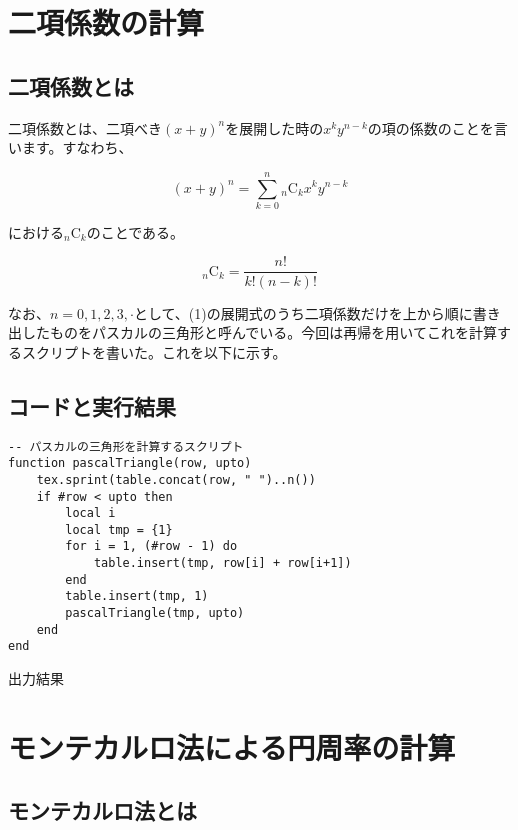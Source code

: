 \documentclass[a4paper]{article}
\begin{document}
	\section{二項係数の計算}
	\subsection{二項係数とは}
	二項係数とは、二項べき$(x + y)^{n}$を展開した時の$x^{k}y^{n-k}$の項の係数のことを言います。すなわち、

	\begin{equation}
		(x+y)^{n} = \sum_{k=0}^{n} {}_{n}\mathrm{C}_{k} x^{k}y^{n-k}
	\end{equation}

	における${}_n\mathrm{C}_{k}$のことである。

	\begin{equation}
		{}_{n}\mathrm{C}_{k} = \frac{n!}{k!(n-k)!}
	\end{equation}

	なお、$n = 0,1,2,3,\cdot$として、(1)の展開式のうち二項係数だけを上から順に書き出したものをパスカルの三角形と呼んでいる。今回は再帰を用いてこれを計算するスクリプトを書いた。これを以下に示す。

	\subsection{コードと実行結果}
	\begin{lstlisting}
-- パスカルの三角形を計算するスクリプト
function pascalTriangle(row, upto)
	tex.sprint(table.concat(row, " ")..n())
	if #row < upto then
		local i
		local tmp = {1}
		for i = 1, (#row - 1) do
			table.insert(tmp, row[i] + row[i+1])
		end 
		table.insert(tmp, 1)
		pascalTriangle(tmp, upto)
	end
end
	\end{lstlisting}

	\begin{itembox}[l]{出力結果}
		\centering
		{\scriptsize {}}
	\end{itembox}

	
	\section{モンテカルロ法による円周率の計算}
	\subsection{モンテカルロ法とは}

\end{document}
